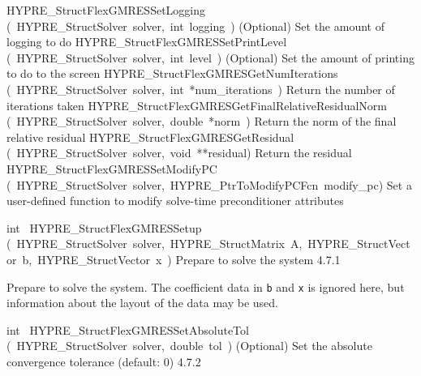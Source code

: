 \documentclass{article}
\begin{document}
\begin{cxxentry}
\begin{cxxentry}
\begin{cxxnames}
        {HYPRE\_StructFlexGMRESSetLogging}
        {(\ HYPRE\_StructSolver\ solver,\ int\ logging\ )}
        {
(Optional) Set the amount of logging to do}
        {}
\label{cxx.4.7.10}
        {HYPRE\_StructFlexGMRESSetPrintLevel}
        {(\ HYPRE\_StructSolver\ solver,\ int\ level\ )}
        {
(Optional) Set the amount of printing to do to the screen}
        {}
\label{cxx.4.7.11}
        {HYPRE\_StructFlexGMRESGetNumIterations}
        {(\ HYPRE\_StructSolver\ solver,\ int\ *num\_iterations\ )}
        {
Return the number of iterations taken}
        {}
\label{cxx.4.7.12}
        {HYPRE\_StructFlexGMRESGetFinalRelativeResidualNorm}
        {(\ HYPRE\_StructSolver\ solver,\ double\ *norm\ )}
        {
Return the norm of the final relative residual}
        {}
\label{cxx.4.7.13}
        {HYPRE\_StructFlexGMRESGetResidual}
        {(\ HYPRE\_StructSolver\ solver,\ void\ **residual)}
        {
Return the residual}
        {}
\label{cxx.4.7.14}
        {HYPRE\_StructFlexGMRESSetModifyPC}
        {(\ HYPRE\_StructSolver\ solver,\ HYPRE\_PtrToModifyPCFcn\ modify\_pc)}
        {
Set a user-defined function to modify solve-time preconditioner attributes}
        {}
\label{cxx.4.7.15}
\end{cxxnames}
\begin{cxxfunction}
{int\ }
        {HYPRE\_StructFlexGMRESSetup}
        {(\ HYPRE\_StructSolver\ solver,\ HYPRE\_StructMatrix\ A,\ HYPRE\_StructVector\ b,\ HYPRE\_StructVector\ x\ )}
        {
Prepare to solve the system}
        {4.7.1}
\begin{cxxdoc}

Prepare to solve the system.  The coefficient data in {\tt b} and {\tt x} is
ignored here, but information about the layout of the data may be used.
\end{cxxdoc}
\end{cxxfunction}
\begin{cxxfunction}
{int\ }
        {HYPRE\_StructFlexGMRESSetAbsoluteTol}
        {(\ HYPRE\_StructSolver\ solver,\ double\ tol\ )}
        {
(Optional) Set the absolute convergence tolerance (default: 0)}
        {4.7.2}
\begin{cxxdoc}


\end{cxxdoc}
\end{cxxfunction}
\end{cxxentry}
\end{cxxentry}
\end{document}
